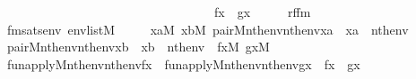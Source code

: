 \begin{isabellebody}
\ \ \ \ \ \ \ \ \ \ \ \ \ \ \ \ \ \ \ \ \ \ \ \ \ \ \ \ \ \ \ \ \ \ \ \ \ fx\ {\isasymnoteq}\ gx{\isacharparenright}{\kern0pt}{\isacharparenright}{\kern0pt}{\isachardoublequoteclose}\isanewline
%
\isadelimproof
%
\endisadelimproof
%
\isatagproof
{}\isamarkupfalse%
\ {\isacharminus}{\kern0pt}\isanewline
\ \ \isamarkupfalse%
\ rffm\ \isanewline
\ \ \ \ fmsats{\isacharcolon}{\kern0pt}{\isachardoublequoteopen}{\isasymAnd}env{\isachardot}{\kern0pt}\ env{\isasymin}list{\isacharparenleft}{\kern0pt}M{\isacharparenright}{\kern0pt}\ {\isasymLongrightarrow}\isanewline
\ \ \ \ {\isacharparenleft}{\kern0pt}{\isasymexists}xa{\isasymin}M{\isachardot}{\kern0pt}\ {\isasymexists}xb{\isasymin}M{\isachardot}{\kern0pt}\ pair{\isacharparenleft}{\kern0pt}{\isacharhash}{\kern0pt}{\isacharhash}{\kern0pt}M{\isacharcomma}{\kern0pt}nth{\isacharparenleft}{\kern0pt}{}{\isacharcomma}{\kern0pt}env{\isacharparenright}{\kern0pt}{\isacharcomma}{\kern0pt}nth{\isacharparenleft}{\kern0pt}{}{\isacharcomma}{\kern0pt}env{\isacharparenright}{\kern0pt}{\isacharcomma}{\kern0pt}xa{\isacharparenright}{\kern0pt}\ {\isacharampersand}{\kern0pt}\ xa\ {\isasymin}\ nth{\isacharparenleft}{\kern0pt}{}{\isacharcomma}{\kern0pt}env{\isacharparenright}{\kern0pt}\ {\isacharampersand}{\kern0pt}\isanewline
\ \ \ \ pair{\isacharparenleft}{\kern0pt}{\isacharhash}{\kern0pt}{\isacharhash}{\kern0pt}M{\isacharcomma}{\kern0pt}nth{\isacharparenleft}{\kern0pt}{}{\isacharcomma}{\kern0pt}env{\isacharparenright}{\kern0pt}{\isacharcomma}{\kern0pt}nth{\isacharparenleft}{\kern0pt}{}{\isacharcomma}{\kern0pt}env{\isacharparenright}{\kern0pt}{\isacharcomma}{\kern0pt}xb{\isacharparenright}{\kern0pt}\ {\isacharampersand}{\kern0pt}\ xb\ {\isasymin}\ nth{\isacharparenleft}{\kern0pt}{}{\isacharcomma}{\kern0pt}env{\isacharparenright}{\kern0pt}\ {\isacharampersand}{\kern0pt}\ {\isacharparenleft}{\kern0pt}{\isasymexists}fx{\isasymin}M{\isachardot}{\kern0pt}\ {\isasymexists}gx{\isasymin}M{\isachardot}{\kern0pt}\isanewline
\ \ \ \ fun{\isacharunderscore}{\kern0pt}apply{\isacharparenleft}{\kern0pt}{\isacharhash}{\kern0pt}{\isacharhash}{\kern0pt}M{\isacharcomma}{\kern0pt}nth{\isacharparenleft}{\kern0pt}{}{\isacharcomma}{\kern0pt}env{\isacharparenright}{\kern0pt}{\isacharcomma}{\kern0pt}nth{\isacharparenleft}{\kern0pt}{}{\isacharcomma}{\kern0pt}env{\isacharparenright}{\kern0pt}{\isacharcomma}{\kern0pt}fx{\isacharparenright}{\kern0pt}\ {\isacharampersand}{\kern0pt}\ fun{\isacharunderscore}{\kern0pt}apply{\isacharparenleft}{\kern0pt}{\isacharhash}{\kern0pt}{\isacharhash}{\kern0pt}M{\isacharcomma}{\kern0pt}nth{\isacharparenleft}{\kern0pt}{}{\isacharcomma}{\kern0pt}env{\isacharparenright}{\kern0pt}{\isacharcomma}{\kern0pt}nth{\isacharparenleft}{\kern0pt}{}{\isacharcomma}{\kern0pt}env{\isacharparenright}{\kern0pt}{\isacharcomma}{\kern0pt}gx{\isacharparenright}{\kern0pt}\ {\isacharampersand}{\kern0pt}\ fx\ {\isasymnoteq}\ gx{\isacharparenright}{\kern0pt}{\isacharparenright}{\kern0pt}\isanewline

\end{isabellebody}
